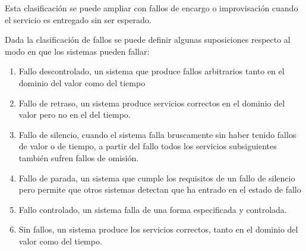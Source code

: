 Esta clasificación se puede ampliar con fallos de encargo o improvisación cuando
el servicio es entregado sin ser esperado.

Dada la clasificación de fallos se puede definir algunas suposiciones respecto
al modo en que los sistemas pueden fallar:

\begin{enumerate}
	\item Fallo descontrolado, un sistema que produce fallos arbitrarios
		tanto en el dominio del valor como del tiempo
	\item Fallo de retraso, un sistema produce servicios correctos en el
		dominio del valor pero no en el del tiempo.
	\item Fallo de silencio, cuando el sistema falla bruscamente sin haber
		tenido fallos de valor o de tiempo, a partir del fallo todos los
		servicios subsiguientes también sufren fallos de omisión.
	\item Fallo de parada, un sistema que cumple los requisitos de un fallo
		de silencio pero permite que otros sistemas detectan que ha
		entrado en el estado de fallo
	\item Fallo controlado, un sistema falla de una forma especificada y
		controlada.
	\item Sin fallos, un sistema produce los servicios correctos, tanto en
		el dominio del valor como del tiempo.
\end{enumerate}
